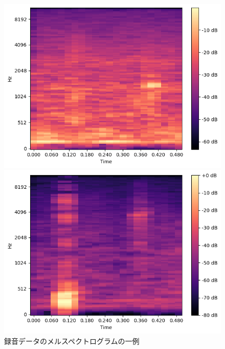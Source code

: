 \begin{figure}[t]
\begin{minipage}[b]{0.16\hsize}
        \includegraphics[width=\hsize]{img/melspec/jelly.png}
    \end{minipage}
    \begin{minipage}[b]{0.16\hsize}
        \centering
        \includegraphics[width=\hsize]{img/melspec/grilled-fish.png}
    \end{minipage}
    \caption{録音データのメルスペクトログラムの一例}
    \label{fig:sample-melspec-data}
\end{figure}

